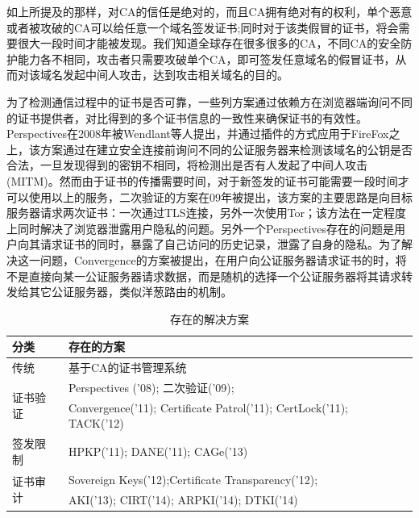 如上所提及的那样，对CA的信任是绝对的，而且CA拥有绝对有的权利，单个恶意或者被攻破的CA可以给任意一个域名签发证书\supercite{ducklin2013turktrust};同时对于该类假冒的证书，将会需要很大一段时间才能被发现。我们知道全球存在很多很多的CA，不同CA的安全防护能力各不相同，攻击者只需要攻破单个CA，即可签发任意域名的假冒证书，从而对该域名发起中间人攻击，达到攻击相关域名的目的。





为了检测通信过程中的证书是否可靠，一些列方案通过依赖方在浏览器端询问不同的证书提供者，对比得到的多个证书信息的一致性来确保证书的有效性。Perspectives\supercite{wendlandt2008perspectives}在2008年被Wendlant等人提出，并通过插件的方式应用于FireFox之上，该方案通过在建立安全连接前询问不同的公证服务器来检测该域名的公钥是否合法，一旦发现得到的密钥不相同，将检测出是否有人发起了中间人攻击(MITM)。然而由于证书的传播需要时间，对于新签发的证书可能需要一段时间才可以使用以上的服务，二次验证\supercite{alicherry2009doublecheck}的方案在09年被提出，该方案的主要思路是向目标服务器请求两次证书：一次通过TLS连接，另外一次使用Tor\supercite{alicherry2009doublecheck}；该方法在一定程度上同时解决了浏览器泄露用户隐私的问题。另外一个Perspectives存在的问题是用户向其请求证书的同时，暴露了自己访问的历史记录，泄露了自身的隐私。为了解决这一问题，Convergence\supercite{convergence}的方案被提出，在用户向公证服务器请求证书的时，将不是直接向某一公证服务器请求数据，而是随机的选择一个公证服务器将其请求转发给其它公证服务器，类似洋葱路由的机制。

\renewcommand\arraystretch{2}
\begin{table}[h]
\centering
\begin{tabular}{p{2.5cm}p{12cm}}
	\hline
	分类 & 存在的方案 \\
	\hline
	传统 & \small 基于CA的证书管理系统 \\
	\hline
	\multirow{2}{*}{证书验证} & \small Perspectives ('08)\parencite{wendlandt2008perspectives}; 二次验证('09)\parencite{alicherry2009doublecheck};   \\ \cline{2-2}
	& \small Convergence('11)\parencite{convergence}; Certificate Patrol('11)\parencite{modell2014certificate}; CertLock('11)\parencite{soghoian2011certified}; TACK('12)\parencite{marlinspike2012internet} \\
	\hline
	签发限制 & \small HPKP('11)\parencite{evans2015public}; DANE('11)\parencite{barnes2011dane}; CAGe('13)\parencite{kasten2013cage} \\
	\hline
	\multirow{2}{*}{证书审计} & \small Sovereign Keys('12)\parencite{eckersley2012internet};Certificate Transparency('12)\parencite{laurie2013certificate}; \\ \cline{2-2}
	& \small AKI('13)\parencite{kim2013accountable}; CIRT('14)\parencite{ryan2014enhanced}; ARPKI('14)\parencite{basin2014arpki}; DTKI('14)\parencite{cheval2014dtki}	 \\
	\hline
	
\end{tabular}
\caption{存在的解决方案}\label{proposed} %
\end{table}

